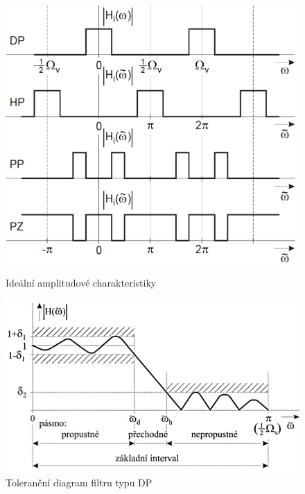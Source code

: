 \begin{figure}[h]
	\centering
	\begin{minipage}[b]{0.4\textwidth}
		\includegraphics[width=1\linewidth]{../assets/figures/amp_characteristics}
		\caption{Ideální amplitudové charakteristiky \cite{Skop1994}}
		\label{fig:amp_characteristics}
	\end{minipage}
	\hfill
	\begin{minipage}[b]{0.5\textwidth}
		\includegraphics[width=1\linewidth]{../assets/figures/tolerance_diagram}
		\caption{Toleranční diagram filtru typu DP \cite{Skop1994}}
		\label{fig:tolerance_diagram}
	\end{minipage}
\end{figure}

